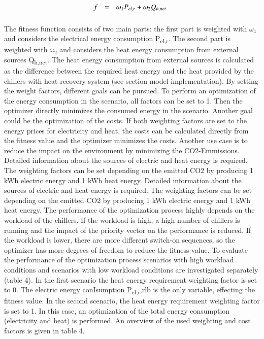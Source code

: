 \documentclass[3p,times,procedia,twocolumn,twoside]{elsarticle}
\begin{document}
\begin{equation}
\begin{array}{@{}lcl}

\displaystyle 
f &=& 
\displaystyle 
\omega_{1}P_{el,r} + \omega_{2}Q_{h,net}
\\[6pt]

\end{array}\vspace*{-12pt}
\end{equation}

The fitness function consists of two main parts: the first part is weighted with $ \omega_{1} $ and considers the electrical energy consumption P\textsubscript{el,r}. The second part is weighted with $ \omega_{2} $ and considers the heat energy consumption from external sources Q\textsubscript{h,net}. The heat energy consumption from external sources is calculated as the difference between the required heat energy and the heat provided by the chillers with heat recovery system (see section model implementation).
By setting the weight factors, different goals can be pursued. To perform an optimization of the energy consumption in the scenario, all factors can be set to 1. Then the optimizer directly minimizes the consumed energy in the scenario. Another goal could be the optimization of the costs. If both weighting factors are set to the energy prices for electricity and heat, the costs can be calculated directly from the fitness value and the optimizer minimizes the costs. Another use case is to reduce the impact on the environment by minimizing the CO2-Emmissions. Detailed information about the sources of electric and heat energy is required. The weighting factors can be set depending on the emitted CO2 by producing 1 kWh electric energy and 1 kWh heat energy.
Detailed information about the sources of electric and heat energy is required. The weighting factors can be set depending on the emitted CO2 by producing 1 kWh electric energy and 1 kWh heat energy.
The performance of the optimization process highly depends on the workload of the chillers. If the workload is high, a high number of chillers is running and the impact of the priority vector on the performance is reduced. If the workload is lower, there are more different switch-on sequences, so the optimizer has more degrees of freedom to reduce the fitness value. To evaluate the performance of the optimization process scenarios with high workload conditions and scenarios with low workload conditions are investigated separately (table 4).
In the first scenario the heat energy requirement weighting factor is set to 0. The electric energy conIsumption P\textsubscript{el,r},rlb is the only variable, effecting the fitness value. In the second scenario, the heat energy requirement weighting factor is set to 1. In this case, an optimization of the total energy consumption (electricity and heat) is performed. An overview of the used weighting and cost factors is given in table 4.
\end{document}
